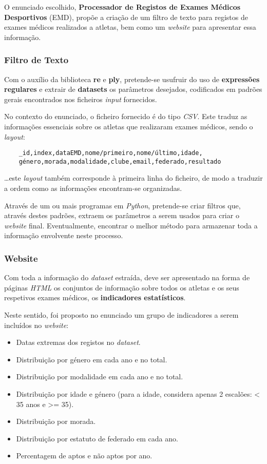 O enunciado escolhido, \textbf{Processador de Registos de Exames Médicos Desportivos} (EMD), propõe a criação de um 
filtro de texto para registos de exames médicos realizados a atletas, bem como um \textit{website} para apresentar 
essa informação.

\subsubsection{Filtro de Texto}

Com o auxílio da biblioteca \textbf{re} e \textbf{ply}, pretende-se usufruir do uso de \textbf{expressões regulares} e extrair de \textbf{datasets}
os parâmetros desejados, codificados em padrões gerais encontrados nos ficheiros \textit{input} fornecidos.

No contexto do enunciado, o ficheiro fornecido é do tipo \textit{CSV}.
Este traduz as informações essenciais sobre os atletas que realizaram exames médicos, sendo o \textit{layout}:

\begin{verbatim}
    _id,index,dataEMD,nome/primeiro,nome/último,idade,
    género,morada,modalidade,clube,email,federado,resultado
\end{verbatim}

\dots este \textit{layout} também corresponde à primeira linha do ficheiro, de modo a traduzir a ordem como as informações 
encontram-se organizadas.

Através de um ou mais programas em \textit{Python}, pretende-se criar filtros que, através destes padrões, extraem os 
parâmetros a serem usados para criar o \textit{website} final.
Eventualmente, encontrar o melhor método para armazenar toda a informação envolvente neste processo.

\subsubsection{Website}

Com toda a informação do \textit{dataset} estraída, deve ser apresentado na forma de páginas \textit{HTML} os conjuntos de 
informação sobre todos os atletas e os seus respetivos exames médicos, os \textbf{indicadores estatísticos}. 

Neste sentido, foi proposto no enunciado um grupo de indicadores a serem incluídos no \textit{website}:
\begin{itemize}
    \item Datas extremas dos registos no \textit{dataset}.
    \item Distribuição por género em cada ano e no total.
    \item Distribuição por modalidade em cada ano e no total.
    \item Distribuição por idade e género (para a idade, considera apenas 2 escalões: < 35 anos e >= 35).
    \item Distribuição por morada.
    \item Distribuição por estatuto de federado em cada ano.
    \item Percentagem de aptos e não aptos por ano.
\end{itemize}

